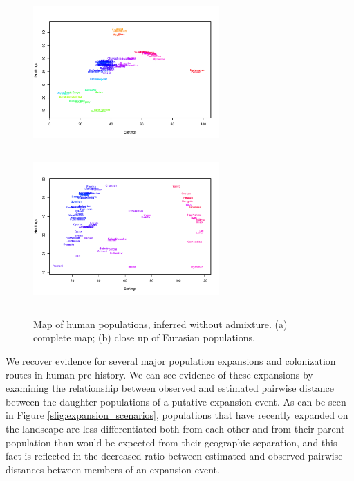 \documentclass[12pt]{article}
\begin{document}
\begin{figure}
	\centering
			{\includegraphics[width=2.8in,height=2.3in]{figs/globetrotter/globe_NoAd_map.png}}
			{\includegraphics[width=2.8in,height=2.3in]{figs/globetrotter/globe_Eurasia_NoAd_map_indproc.png}}
	\caption{Map of human populations, inferred without admixture. (a) complete map; (b) close up of Eurasian 
populations.}\label{sfig:globe_noad_maps}
\end{figure}

We recover evidence for several major population expansions and colonization routes in human pre-history.  We can see evidence of these expansions by examining the relationship between observed and estimated pairwise distance between the daughter populations of a putative expansion event.   As can be seen in Figure \ref{sfig:expansion_scenarios}, populations that have recently expanded on the landscape are less differentiated both from each other and from their parent population than would be expected from their geographic separation, and this fact is reflected in the decreased ratio between estimated and observed pairwise distances between members of an expansion event.
\end{document}
